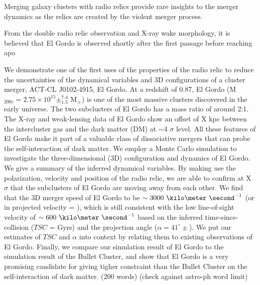 
Merging galaxy clusters with radio relics provide rare insights to the merger
dynamics as the relics are created by the
violent merger process. 

From the double radio relic observation and X-ray wake morphology, 
it is believed that El Gordo is observed shortly after the first passage
before reaching apo

We demonstrate one of the first uses of the
properties of the radio relic
to reduce the uncertainties of the dynamical variables 
and 3D configurations of a cluster merger, ACT-CL J0102-4915, El Gordo. 
At a redshift of 0.87, El Gordo (M$_{200c} = 
2.75\times10^{15} \pm^{7.4}_{1.5}$ M$_{\sun}$) is one of the most massive
clusters discovered in the early universe. The two subclusters of El
Gordo has a mass ratio of around 2:1. 
The X-ray and weak-lensing data of El Gordo show an offset of X kpc between
the intercluster gas and the dark matter (DM) at $\sim$4 $\sigma$ level.
All these features of El Gordo make it part of a valuable class of
dissociative mergers that can probe the self-interaction of dark matter.
We employ a Monte Carlo simulation to investigate the three-dimensional (3D)
configuration and dynamics of El Gordo. 
We give a summary of the inferred
dynamical variables. By making use the polarization, velocity and position
of the radio relic, we are able to confirm at X $\sigma$ that the subclusters of El Gordo are moving away from each other. We find that
the 3D merger speed of El Gordo to be $\sim3000~\kilo\meter~
\second^{-1}$ (or in projected velocity = ), which is still consistent with the low line-of-sight
velocity of $\sim600~\kilo\meter~\second^{-1}$ based on the inferred time-since-collision ($TSC$ = Gyrs) and
the projection angle (\(\alpha = 41^{\circ}\pm \)). We put our estimates of $TSC$ and $\alpha$ into context by relating them to existing observations of El Gordo. 
Finally, we compare our simulation result of El Gordo to the simulation
result of the Bullet Cluster, and show that
El Gordo is a very promising candidate for giving tigher constraint than
the Bullet Cluster on the self-interaction of dark matter. 
(200 words)
(check against astro-ph word limit)

